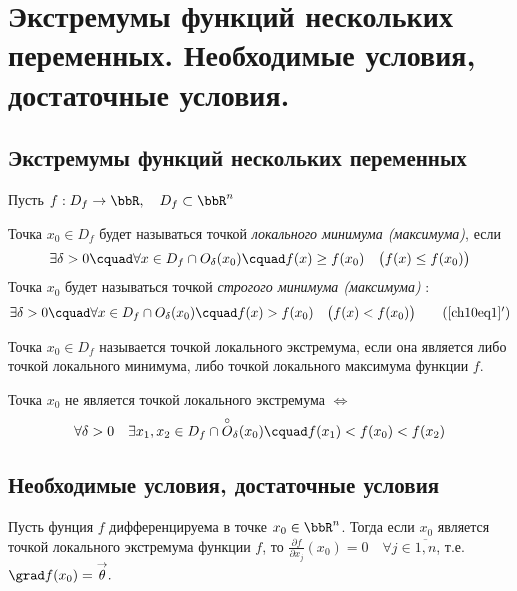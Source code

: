 \chapter[Экстремумы функций нескольких переменных. Необходимые условия, достаточные условия.]{Экстремумы функций нескольких переменных. Необходимые условия, достаточные условия\footnotemark.}

\section{Экстремумы функций нескольких переменных}

Пусть $f: D_f \to \bbR, \quad D_f \subset \bbR^n$

\begin{defn}
Точка $x_0 \in D_f$ будет называться точкой \textit{локального минимума (максимума)}, если 
\begin{equation} \label{ch10eq1}
\exists \delta > 0 \cquad \forall x \in D_f \cap O_\delta(x_0) \cquad f(x) \ge f(x_0)\quad \bigl(f(x) \le f(x_0)\bigr)
\end{equation} 
Точка $x_0$ будет называться точкой \textit{строгого минимума (максимума)} :
\begin{equation}\label{ch10eq1'}
\exists \delta > 0\cquad \forall x \in D_f \cap O_\delta(x_0) \cquad f(x) > f(x_0)\quad \bigl(f(x) < f(x_0)\bigr)
\tag{\ref{ch10eq1}$'$} 
\end{equation} 
\end{defn}

\begin{defn}
Точка $x_0 \in D_f$ называется точкой локального экстремума, если она является либо точкой локального минимума, либо точкой локального максимума функции $f$.

Точка $x_0$ не является точкой локального экстремума $\Leftrightarrow$ $$\forall \delta > 0 \quad \exists x_1, x_2 \in D_f \cap \overset{\circ}{O}_\delta(x_0) \cquad f(x_1) < f(x_0) < f(x_2)$$
\end{defn}
\section{Необходимые условия, достаточные условия}

\begin{thm} \label{ch10thm1}
Пусть фунция $f$ дифференцируема в точке $x_0 \in \bbR^n$. Тогда если $x_0$ является точкой локального экстремума функции $f$, то $\frac{\partial f}{\partial x_j}(x_0) = 0 \quad \forall j \in \overline{1,n}$, т.е. $\grad f(x_0) = \overset{\rightarrow}{\theta}.$
\end{thm}

